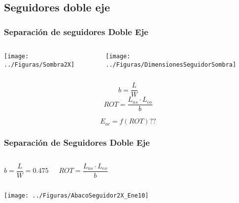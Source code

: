 \documentclass[xcolor=dvipsnames]{beamer}
\begin{document}
\subsection{Seguidores doble eje}



\begin{frame}
\frametitle{Separación de seguidores Doble Eje}
\begin{columns}%


\column{7cm}

\begin{center}
\texttt{[image: ../Figuras/Sombra2X]} 
\par\end{center}


\column{3cm}

\begin{center}
\texttt{[image: ../Figuras/DimensionesSeguidorSombra]}
\par\end{center}

\end{columns}%
\[
b=\frac{L}{W}\]
\[
ROT=\frac{L_{ns}\cdot L_{eo}}{b}\]


{\large \[
E_{ac}=f(ROT)??\]
}{\large \par}


\end{frame}

\begin{frame}[plain]
\frametitle{Separación de Seguidores Doble Eje}
\begin{columns}[t]%


\column{4cm}

{\footnotesize \[
b=\frac{L}{W}=0.475\]
}{\footnotesize \par}


\column{4cm}

{\footnotesize \[
ROT=\frac{L_{ns}\cdot L_{eo}}{b}\]
}{\footnotesize \par}

\end{columns}%
\begin{center}
\texttt{[image: ../Figuras/AbacoSeguidor2X\_Ene10]}
\par\end{center}


\end{frame}
\end{document}
